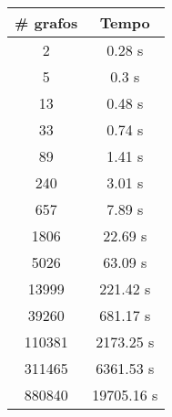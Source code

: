 \begin{tabular}{|c|c|}
    \hline
    \# grafos & Tempo \\
    \hline
    2 & 0.28 s \\
    \hline
    5 & 0.3 s \\
    \hline
    13 & 0.48 s \\
    \hline
    33 & 0.74 s \\
    \hline
    89 & 1.41 s \\
    \hline
    240 & 3.01 s \\
    \hline
    657 & 7.89 s \\
    \hline
    1806 & 22.69 s \\
    \hline
    5026 & 63.09 s \\
    \hline
    13999 & 221.42 s \\
    \hline
    39260 & 681.17 s \\
    \hline
    110381 & 2173.25 s \\
    \hline
    311465 & 6361.53 s \\
    \hline
    880840 & 19705.16 s \\
    \hline
\end{tabular}